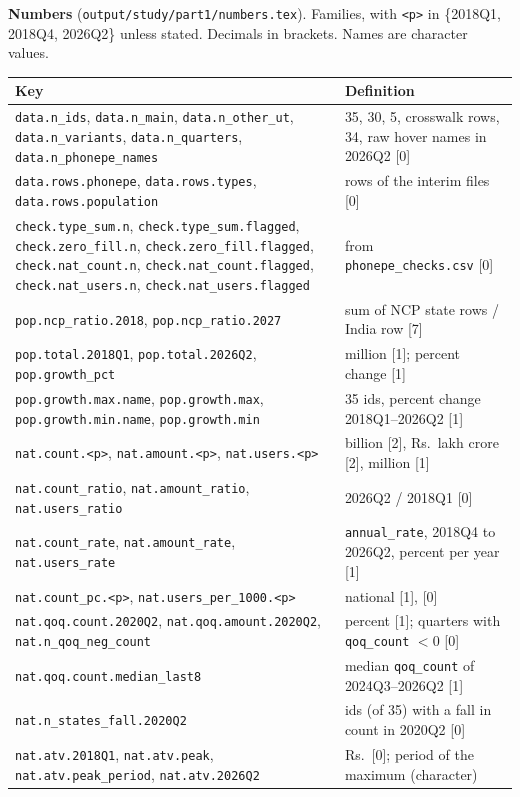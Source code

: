 \documentclass[10pt,a4paper]{article}
\newcommand{\f}[1]{\texttt{#1}}
\begin{document}
\textbf{Numbers} (\f{output/study/part1/numbers.tex}). Families, with \f{<p>} in \{2018Q1, 2018Q4, 2026Q2\}
unless stated. Decimals in brackets. Names are character values.
\begin{longtable}{@{}p{} p{}@{}}
\toprule
Key & Definition \\
\midrule
\endhead
\f{data.n\_ids}, \f{data.n\_main}, \f{data.n\_other\_ut}, \f{data.n\_variants}, \f{data.n\_quarters},
  \f{data.n\_phonepe\_names} & 35, 30, 5, crosswalk rows, 34, raw hover names in 2026Q2 [0] \\
\f{data.rows.phonepe}, \f{data.rows.types}, \f{data.rows.population} & rows of the interim files [0] \\
\f{check.type\_sum.n}, \f{check.type\_sum.flagged}, \f{check.zero\_fill.n}, \f{check.zero\_fill.flagged},
  \f{check.nat\_count.n}, \f{check.nat\_count.flagged}, \f{check.nat\_users.n}, \f{check.nat\_users.flagged}
  & from \f{phonepe\_checks.csv} [0] \\
\f{pop.ncp\_ratio.2018}, \f{pop.ncp\_ratio.2027} & sum of NCP state rows / India row [7] \\
\f{pop.total.2018Q1}, \f{pop.total.2026Q2}, \f{pop.growth\_pct} & million [1]; percent change [1] \\
\f{pop.growth.max.name}, \f{pop.growth.max}, \f{pop.growth.min.name}, \f{pop.growth.min} & 35 ids, percent
  change 2018Q1--2026Q2 [1] \\
\f{nat.count.<p>}, \f{nat.amount.<p>}, \f{nat.users.<p>} & billion [2], Rs.\ lakh crore [2], million [1] \\
\f{nat.count\_ratio}, \f{nat.amount\_ratio}, \f{nat.users\_ratio} & 2026Q2 / 2018Q1 [0] \\
\f{nat.count\_rate}, \f{nat.amount\_rate}, \f{nat.users\_rate} & \f{annual\_rate}, 2018Q4 to 2026Q2, percent per
  year [1] \\
\f{nat.count\_pc.<p>}, \f{nat.users\_per\_1000.<p>} & national [1], [0] \\
\f{nat.qoq.count.2020Q2}, \f{nat.qoq.amount.2020Q2}, \f{nat.n\_qoq\_neg\_count} & percent [1]; quarters with
  \f{qoq\_count} $<0$ [0] \\
\f{nat.qoq.count.median\_last8} & median \f{qoq\_count} of 2024Q3--2026Q2 [1] \\
\f{nat.n\_states\_fall.2020Q2} & ids (of 35) with a fall in count in 2020Q2 [0] \\
\f{nat.atv.2018Q1}, \f{nat.atv.peak}, \f{nat.atv.peak\_period}, \f{nat.atv.2026Q2} & Rs.\ [0]; period of the
  maximum (character) \\

\end{longtable}
\end{document}
